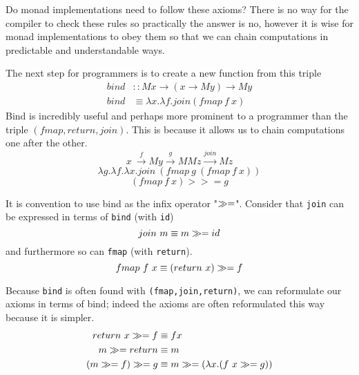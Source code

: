 Do monad implementations need to follow these axioms?
There is no way for the compiler to check these rules so practically the answer is no,
however it is wise for monad implementations to obey them so that
we can chain computations in predictable and understandable ways.

The next step for programmers is to create a new function from this triple
\begin{align}
    bind &:: M x \rightarrow (x \rightarrow M y) \rightarrow M y \\
    bind &\equiv \lambda x. \lambda f. join(fmap\ f\ x)
\end{align}
Bind is incredibly useful and perhaps more prominent
to a programmer than the triple $(fmap,return,join)$.
This is because it allows us to chain computations
one after the other.
\begin{equation}
    x\
    \stackrel{f}{\rightarrow} My
    \stackrel{g}{\rightarrow} MMz
    \stackrel{join}{\rightarrow} Mz
\end{equation}
\begin{equation}
    \lambda g.
    \lambda f.
    \lambda x.
    join\ (fmap\ g\ (fmap\ f\ x))
\end{equation}
\begin{equation}
    (fmap\ f\ x) >>= g
\end{equation}

It is convention to use bind as the infix operator "$\gg=$".
Consider that \texttt{join} can be expressed in terms of \texttt{bind} (with \texttt{id})
\begin{equation}
    join\ m \equiv m \gg= id
\end{equation}
and furthermore so can \texttt{fmap} (with \texttt{return}).
\begin{equation}
    fmap\ f\ x \equiv (return\ x) \gg= f
\end{equation}

Because \texttt{bind} is often found with \texttt{(fmap,join,return)},
we can reformulate our axioms in terms of bind;
indeed the axioms are often reformulated this way because it is simpler.
\begin{align}
    return\ x \gg= f &\equiv f x \\
    m \gg= return &\equiv m \\
    (m \gg= f) \gg= g &\equiv m \gg= (\lambda x.(f\ x \gg= g))
\end{align}


